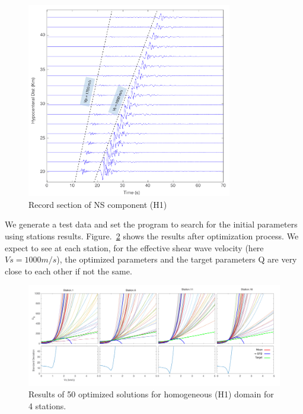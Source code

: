   \begin{figure}[ht]
    \centering
    \includegraphics[width=0.8\textwidth]{figures/pdf/record_section_1000.pdf}
    \caption{Record section of NS component (H1)}
    \label{fig:record_section_1000}
\end{figure}

 We generate a test data and set the program to search for the initial parameters using stations results. Figure.~\ref{fig:station_1_1000_H1} shows the results after optimization process. We expect to see at each station, for the effective shear wave velocity (here $Vs=1000 m/s$), the optimized parameters and the target parameters Q are very close to each other if not the same. 

  \begin{figure}[ht]
    \centering
    \includegraphics[width=\textwidth]{figures/pdf/station_1_1000_H1.pdf}
    \caption{Results of 50 optimized solutions for homogeneous (H1) domain for 4 stations.}
    \label{fig:station_1_1000_H1}
\end{figure}

